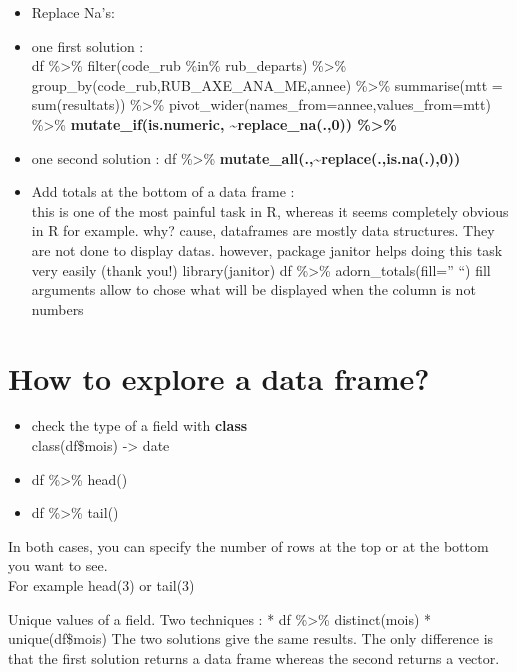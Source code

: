 \documentclass[
]{book}
\begin{document}
\begin{itemize}
\item
  Replace Na's:\\
\item
  one first solution :\\
  df \%\textgreater\% filter(code\_rub \%in\% rub\_departs) \%\textgreater\%
  group\_by(code\_rub,RUB\_AXE\_ANA\_ME,annee) \%\textgreater\% summarise(mtt = sum(resultats)) \%\textgreater\%
  pivot\_wider(names\_from=annee,values\_from=mtt) \%\textgreater\% \textbf{mutate\_if(is.numeric, \textasciitilde replace\_na(.,0)) \%\textgreater\%}
\item
  one second solution :
  df \%\textgreater\% \textbf{mutate\_all(.,\textasciitilde replace(.,is.na(.),0))}
\item
  Add totals at the bottom of a data frame :\\
  this is one of the most painful task in R, whereas it seems completely obvious in R for example.
  why? cause, dataframes are mostly data structures. They are not done to display datas.
  however, package janitor helps doing this task very easily (thank you!)
  library(janitor)
  df \%\textgreater\% adorn\_totals(fill='' ``)
  fill arguments allow to chose what will be displayed when the column is not numbers
\end{itemize}

\hypertarget{how-to-explore-a-data-frame}{%
\section{How to explore a data frame?}\label{how-to-explore-a-data-frame}}

\begin{itemize}
\item
  check the type of a field with \textbf{class}\\
  class(df\$mois) -\textgreater{} date
\item
  df \%\textgreater\% head()
\item
  df \%\textgreater\% tail()
\end{itemize}

In both cases, you can specify the number of rows at the top or at the bottom you want to see.\\
For example head(3) or tail(3)

Unique values of a field. Two techniques :
* df \%\textgreater\% distinct(mois)
* unique(df\$mois)
The two solutions give the same results. The only difference is that the first solution returns a data frame whereas the second returns a vector.
\end{document}
